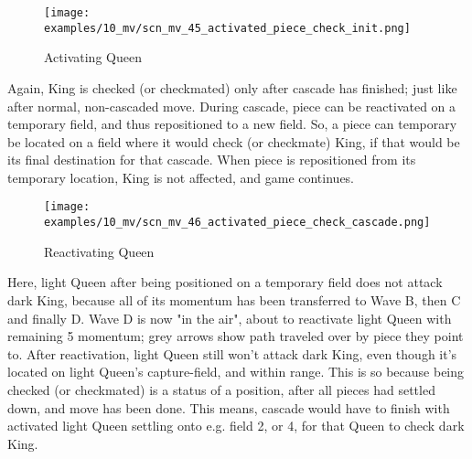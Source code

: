 \vspace*{-1.4\baselineskip}
\noindent
\begin{figure}[!h]
\texttt{[image: examples/10\_mv/scn\_mv\_45\_activated\_piece\_check\_init.png]}
\caption{Activating Queen}
\label{fig:scn_mv_45_activated_piece_check_init}
\end{figure}

Again, King is checked (or checkmated) only after cascade has finished; just like
after normal, non-cascaded move. During cascade, piece can be reactivated on a
temporary field, and thus repositioned to a new field. So, a piece can temporary
be located on a field where it would check (or checkmate) King, if that would be
its final destination for that cascade. When piece is repositioned from its
temporary location, King is not affected, and game continues.

\clearpage %

\vspace*{-2.3\baselineskip}
\noindent
\begin{figure}[!h]
\texttt{[image: examples/10\_mv/scn\_mv\_46\_activated\_piece\_check\_cascade.png]}
\vspace*{-1.3\baselineskip}
\caption{Reactivating Queen}
\label{fig:scn_mv_46_activated_piece_check_cascade}
\end{figure}

\vspace*{-0.3\baselineskip}
Here, light Queen after being positioned on a temporary field does not attack dark
King, because all of its momentum has been transferred to Wave B, then C and finally
D. Wave D is now "in the air", about to reactivate light Queen with remaining 5
momentum; grey arrows show path traveled over by piece they point to. After
reactivation, light Queen still won't attack dark King, even though it's located on
light Queen's capture-field, and within range. This is so because being checked (or
checkmated) is a status of a position, after all pieces had settled down, and move
has been done. This means, cascade would have to finish with activated light Queen
settling onto e.g. field 2, or 4, for that Queen to check dark King.

\clearpage %

